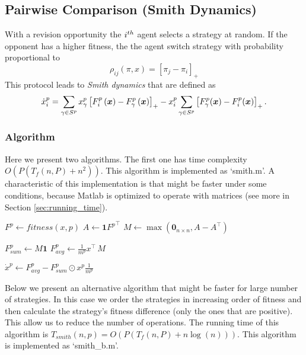 \subsection{Pairwise Comparison (Smith Dynamics)}

With a revision opportunity the $i^{th}$ agent selects a strategy at random. If the opponent has a higher fitness, the the agent switch strategy with probability proportional to
\begin{equation}
\rho_{ij}(\pi, x) = \left[ \pi_j - \pi_i \right]_+
\end{equation}
This protocol leads to \emph{Smith dynamics} that are defined as 
%
\begin{equation} 
\dot{x}_i^p  = \sum_{\gamma \in S^p} x_\gamma^p  \left[ F_i^p \left( \boldsymbol{x} \right) - F_\gamma^p \left( \boldsymbol{x} \right) \right]_+ 
- x_i^p  \sum_{\gamma \in S^p} \left[ F_\gamma^p ( \boldsymbol{x}) - F_i^p( \boldsymbol{x} ) \right]_+.
\label{eq:smith}
\end{equation}


\subsubsection*{Algorithm}

Here we present two algorithms. 
The first one has time complexity  $O(P(T_f(n, P)+ n^2 ))$. This algorithm is implemented as `smith.m'. A characteristic of this implementation is that might be faster under some conditions, because Matlab is optimized to operate with matrices (see more in Section \ref{sec:running_time}).

\begin{algorithm}[H]

 \BlankLine
  {
  $ F^p \leftarrow fitness(x, p)$\;
  $A \leftarrow \boldsymbol{1} {F^p}^\top$\;
  $M \leftarrow \max(\boldsymbol{0}_{n\times n}, A-A^\top)$\;
  
  $F_{sum}^p \leftarrow M \boldsymbol{1}$\;
  $F_{avg}^p \leftarrow \frac{1}{m^p} x^\top \, M$\;

  $ \dot{x}^p \leftarrow F_{avg}^p - F_{sum}^p \odot x^p \frac{1}{m^p}$\;
 }
\end{algorithm}


Below we present an alternative algorithm that might be faster for large number of strategies.
In this case we order the strategies in increasing order of fitness and then calculate the strategy's fitness difference (only the ones that are positive). This allow us to reduce the number of operations. The running time of this algorithm is $T_{smith}(n,p) = O(P(T_f(n, P)+ n\log(n) ))$. This algorithm is implemented as `smith\_b.m'.


